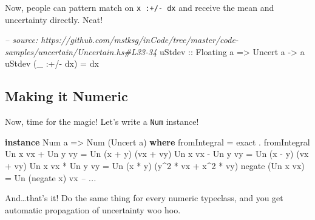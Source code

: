 \documentclass[]{article}
\newenvironment{Shaded}{}{}
\newcommand{\KeywordTok}[1]{\textcolor[rgb]{0.00,0.44,0.13}{\textbf{{#1}}}}
\newcommand{\DataTypeTok}[1]{\textcolor[rgb]{0.56,0.13,0.00}{{#1}}}
\newcommand{\DecValTok}[1]{\textcolor[rgb]{0.25,0.63,0.44}{{#1}}}
\newcommand{\CommentTok}[1]{\textcolor[rgb]{0.38,0.63,0.69}{\textit{{#1}}}}
\newcommand{\OtherTok}[1]{\textcolor[rgb]{0.00,0.44,0.13}{{#1}}}
\newcommand{\FunctionTok}[1]{\textcolor[rgb]{0.02,0.16,0.49}{{#1}}}
\newcommand{\NormalTok}[1]{{#1}}
\begin{document}
Now, people can pattern match on \texttt{x\ :+/-\ dx} and receive the
mean and uncertainty directly. Neat!

\begin{Shaded}
\begin{Highlighting}[]
\CommentTok{-- source: https://github.com/mstksg/inCode/tree/master/code-samples/uncertain/Uncertain.hs#L33-34}
\OtherTok{uStdev ::} \DataTypeTok{Floating} \NormalTok{a }\OtherTok{=>} \DataTypeTok{Uncert} \NormalTok{a }\OtherTok{->} \NormalTok{a}
\NormalTok{uStdev (_ }\FunctionTok{:+/-} \NormalTok{dx) }\FunctionTok{=} \NormalTok{dx}
\end{Highlighting}
\end{Shaded}

\subsection{Making it Numeric}\label{making-it-numeric}

Now, time for the magic! Let's write a \texttt{Num} instance!

\begin{Shaded}
\begin{Highlighting}[]
\KeywordTok{instance} \DataTypeTok{Num} \NormalTok{a }\OtherTok{=>} \DataTypeTok{Num} \NormalTok{(}\DataTypeTok{Uncert} \NormalTok{a) }\KeywordTok{where}
    \NormalTok{fromIntegral      }\FunctionTok{=} \NormalTok{exact }\FunctionTok{.} \NormalTok{fromIntegral}
    \DataTypeTok{Un} \NormalTok{x vx }\FunctionTok{+} \DataTypeTok{Un} \NormalTok{y vy }\FunctionTok{=} \DataTypeTok{Un} \NormalTok{(x }\FunctionTok{+} \NormalTok{y)    (vx }\FunctionTok{+} \NormalTok{vy)}
    \DataTypeTok{Un} \NormalTok{x vx }\FunctionTok{-} \DataTypeTok{Un} \NormalTok{y vy }\FunctionTok{=} \DataTypeTok{Un} \NormalTok{(x }\FunctionTok{-} \NormalTok{y)    (vx }\FunctionTok{+} \NormalTok{vy)}
    \DataTypeTok{Un} \NormalTok{x vx }\FunctionTok{*} \DataTypeTok{Un} \NormalTok{y vy }\FunctionTok{=} \DataTypeTok{Un} \NormalTok{(x }\FunctionTok{*} \NormalTok{y)    (y}\FunctionTok{^}\DecValTok{2} \FunctionTok{*} \NormalTok{vx }\FunctionTok{+} \NormalTok{x}\FunctionTok{^}\DecValTok{2} \FunctionTok{*} \NormalTok{vy)}
    \NormalTok{negate (}\DataTypeTok{Un} \NormalTok{x vx)  }\FunctionTok{=} \DataTypeTok{Un} \NormalTok{(negate x) vx}
    \CommentTok{-- ...}
\end{Highlighting}
\end{Shaded}

And\ldots{}that's it! Do the same thing for every numeric typeclass, and
you get automatic propagation of uncertainty woo hoo.
\end{document}
